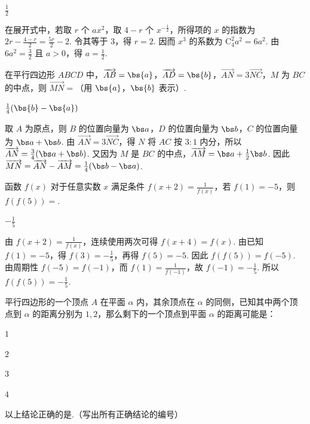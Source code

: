 \begin{answer}
\(\frac{1}{2}\)
\end{answer}

\begin{solution}
在展开式中，若取 \(r\) 个 \(ax^2\)，取 \(4-r\) 个 \(x^{-\frac{1}{2}}\)，所得项的 \(x\) 的指数为 \(2r-\frac{4-r}{2}=\frac{5r}{2}-2\). 令其等于 \(3\)，得 \(r=2\). 因而 \(x^3\) 的系数为 \(\mathrm C_4^2a^2=6a^2\). 由 \(6a^2=\frac32\) 且 \(a>0\)，得 \(a=\frac12\).
\end{solution}

\begin{problem}
在平行四边形 \(ABCD\) 中，\(\overrightarrow{AB} = \bs{a}\)，\(\overrightarrow{AD} = \bs{b}\)，\(\overrightarrow{AN} = 3\overrightarrow{NC}\)，\(M\) 为 \(BC\) 的中点，则 \(\overrightarrow{MN} =\)\fillinblank{}（用 \(\bs{a}\)，\(\bs{b}\) 表示）.
\end{problem}

\begin{answer}
\(\frac{1}{4}(\bs{b}-\bs{a})\)
\end{answer}

\begin{solution}
取 \(A\) 为原点，则 \(B\) 的位置向量为 \(\bs a\)，\(D\) 的位置向量为 \(\bs b\)，\(C\) 的位置向量为 \(\bs a+\bs b\). 由 \(\overrightarrow{AN}=3\overrightarrow{NC}\)，得 \(N\) 将 \(AC\) 按 \(3:1\) 内分，所以 \(\overrightarrow{AN}=\frac34(\bs a+\bs b)\). 又因为 \(M\) 是 \(BC\) 的中点，\(\overrightarrow{AM}=\bs a+\frac12\bs b\). 因此 \(\overrightarrow{MN}=\overrightarrow{AN}-\overrightarrow{AM}=\frac14(\bs b-\bs a)\).
\end{solution}

\begin{problem}
函数 \( f(x) \) 对于任意实数 \( x \) 满足条件 \( f(x + 2) = \frac{1}{f(x)} \)，若 \( f(1) = -5 \)，则 \( f(f(5)) = \)\fillinblank{}.
\end{problem}

\begin{answer}
\(-\frac{1}{5}\)
\end{answer}

\begin{solution}
由 \(f(x+2)=\frac1{f(x)}\)，连续使用两次可得 \(f(x+4)=f(x)\). 由已知 \(f(1)=-5\)，得 \(f(3)=-\frac15\)，再得 \(f(5)=-5\). 因此 \(f(f(5))=f(-5)\). 由周期性 \(f(-5)=f(-1)\)，而 \(f(1)=\frac1{f(-1)}\)，故 \(f(-1)=-\frac15\). 所以 \(f(f(5))=-\frac15\).
\end{solution}

\begin{problem}
平行四边形的一个顶点 \(A\) 在平面 \(\alpha\) 内，其余顶点在 \(\alpha\) 的同侧，已知其中两个顶点到 \(\alpha\) 的距离分别为 \(1, 2\)，那么剩下的一个顶点到平面 \(\alpha\) 的距离可能是：

\begin{circlelist}
\item \(1\)
\item \(2\)
\item \(3\)
\item \(4\)
\end{circlelist}

以上结论正确的是\fillinblank{}.（写出所有正确结论的编号）
\end{problem}

